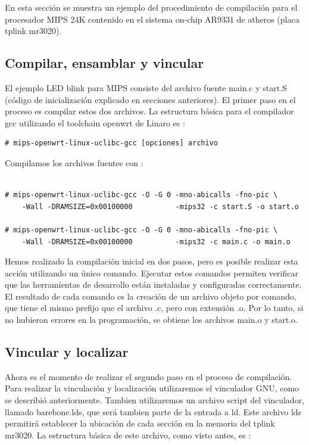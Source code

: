\documentclass[output=paper, 
colorlinks,
citecolor=brown,
newtxmath
]{langscibook}
\begin{document}
En esta sección se muestra un ejemplo del procedimiento de compilación 
para el procesador MIPS 24K contenido en el sistema on-chip AR9331 de atheros
(placa tplink mr3020).

\subsection {Compilar, ensamblar y vincular}

El ejemplo LED blink para MIPS consiste del archivo fuente main.c y start.S
(código de inicialización explicado en secciones anteriores).
El primer paso en el proceso es compilar estos dos archivos.
La estructura básica para el compilador gcc utilizando el toolchain openwrt
de Linaro es :

\begin{verbatim}
# mips-openwrt-linux-uclibc-gcc [opciones] archivo
\end{verbatim}

Compilamos los archivos fuentes con :

\begin{verbatim}

# mips-openwrt-linux-uclibc-gcc -O -G 0 -mno-abicalls -fno-pic \
    -Wall -DRAMSIZE=0x00100000          -mips32 -c start.S -o start.o

# mips-openwrt-linux-uclibc-gcc -O -G 0 -mno-abicalls -fno-pic \
    -Wall -DRAMSIZE=0x00100000          -mips32 -c main.c -o main.o

\end{verbatim}

Hemos realizado la compilación inicial en dos pasos, pero es posible realizar
esta acción utilizando un único comando. Ejecutar estos comandos 
permiten verificar que las herramientas de desarrollo
están instaladas y configuradas correctamente. El resultado 
de cada comando es la creación de un archivo objeto por comando, que tiene
el mismo prefijo que el archivo .c, pero con extensión .o.
Por lo tanto, si no hubieron errores en la programación, se obtiene
los archivos main.o y start.o.

\subsection {Vincular y localizar}

Ahora es el momento de realizar el segundo paso en el proceso de compilación.
Para realizar la vinculación y localización utilizaremos el vinculador GNU,
como se describió anteriormente. Tambien
utilizaremos un archivo script del vinculador, llamado
barebone.lds, que será tambien parte de la entrada a ld. Este archivo lds
permitirá establecer la ubicación de cada sección en la memoria del tplink
mr3020.  La estructura básica de este archivo, como visto antes, es :
\end{document}
